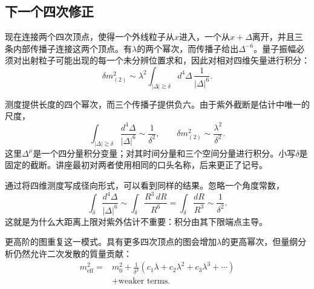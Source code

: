 \subsection{下一个四次修正}

现在连接两个四次顶点，使得一个外线粒子从\(x\)进入，一个从\(x+\Delta\)离开，并且三条内部传播子连接这两个顶点。有\(\lambda\)的两个幂次，而传播子给出\(\Delta^{-6}\)。量子振幅必须对出射粒子可能出现的每一个未分辨位置求和，因此对相对四维矢量进行积分：
\begin{equation}
\delta m^2_{(2)}
\sim
\lambda^2
\int_{|\Delta|\gtrsim\delta}
d^4\Delta\,\frac{1}{|\Delta|^6}.
\label{eq:two-loop-power-count}
\end{equation}

\begin{classroomqa}
\end{classroomqa}

测度提供长度的四个幂次，而三个传播子提供负六。由于紫外截断是估计中唯一的尺度，
\begin{equation}
\int_{|\Delta|\gtrsim\delta}
\frac{d^4\Delta}{|\Delta|^6}
\sim\frac{1}{\delta^2},
\qquad
\delta m^2_{(2)}
\sim\frac{\lambda^2}{\delta^2}.
\label{eq:two-loop-scalar-mass}
\end{equation}
这里\(\Delta^\mu\)是一个四分量积分变量；对其时间分量和三个空间分量进行积分。小写\(\delta\)是固定的截断。讲座最初对两者使用相同的口头名称，后来更正了记号。

通过将四维测度写成径向形式，可以看到同样的结果。忽略一个角度常数，
\begin{equation}
\int_{\delta}\frac{d^4\Delta}{|\Delta|^6}
\sim
\int_{\delta}\frac{R^3\,dR}{R^6}
=\int_{\delta}\frac{dR}{R^3}
\sim\frac{1}{\delta^2}.
\end{equation}
这就是为什么大距离上限对紫外估计不重要：积分由其下限端点主导。

更高阶的图重复这一模式。具有更多四次顶点的图会增加\(\lambda\)的更高幂次，但量纲分析仍然允许二次发散的質量贡献：
\begin{equation}
\begin{aligned}
m_{\mathrm{eff}}^2
={}&m_0^2
+\frac{1}{\delta^2}
\left(c_1\lambda+c_2\lambda^2+c_3\lambda^3+\cdots\right)\\
&+\text{weaker terms}.
\end{aligned}
\label{eq:scalar-mass-series}
\end{equation}


